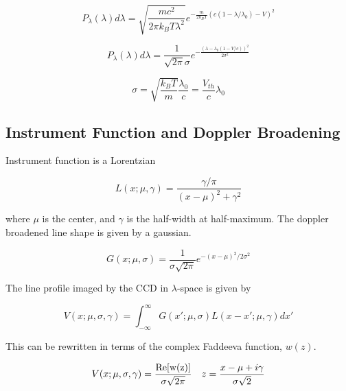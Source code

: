 \documentclass{article}
\begin{document}
\begin{equation}
P_{\lambda}(\lambda) d \lambda = \sqrt{\frac{m c^2}{2 \pi k_B T \lambda^2}} e^{-\frac{m}{2 k_B T} \left(c(1-\lambda / \lambda_0 ) - V \right)^2}
\end{equation}

\begin{equation}
P_{\lambda}(\lambda) d \lambda = \frac{1}{\sqrt{2 \pi} \sigma} e^{-\frac{\left(\lambda - \lambda_0(1 - V/c)\right)^2}{2 \sigma^2}}
\end{equation}

\begin{equation}
\sigma = \sqrt{\frac{k_B T}{m}} \frac{\lambda_0}{c} = \frac{V_{th}}{c} \lambda_0
\end{equation}

\subsection{Instrument Function and Doppler Broadening}

Instrument function is a Lorentzian

\begin{equation}
L(x;\mu,\gamma) = \frac{\gamma / \pi}{(x-\mu)^2 + \gamma^2}
\end{equation}

where $\mu$ is the center, and $\gamma$ is the half-width at half-maximum.  The doppler broadened line shape is given by a gaussian.

\begin{equation}
G(x;\mu, \sigma) = \frac{1}{\sigma \sqrt{2 \pi}} e^{-(x-\mu)^2 / 2 \sigma^2}
\end{equation}

The line profile imaged by the CCD in $\lambda$-space is given by

\begin{equation}
V(x;\mu,\sigma,\gamma) = \int_{-\infty}^{\infty} G(x';\mu,\sigma) L(x-x';\mu,\gamma) dx' 
\end{equation}

This can be rewritten in terms of the complex Faddeeva function, $w(z)$.

\begin{equation}
 V(x;\mu,\sigma,\gamma) = \frac{\rm{Re}[w(z)]}{\sigma \sqrt{2 \pi}} \quad z=\frac{x - \mu + i \gamma}{\sigma \sqrt{2}}
\end{equation} 

%

%

\end{document}
